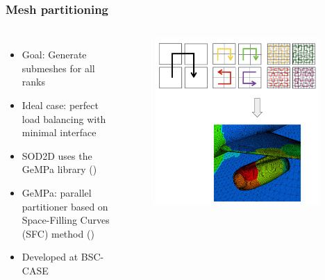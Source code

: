 \begin{frame}
	\frametitle{Mesh partitioning}
	\begin{columns}
		\begin{itemize}
			\item Goal: Generate submeshes for all ranks
			\item Ideal case: perfect load balancing with minimal interface
			\item SOD2D uses the GeMPa library (\cite{bib:gempa})
			\item GeMPa: parallel partitioner based on Space-Filling Curves (SFC) method (\cite{bib:ric})
			\item Developed at BSC-CASE
		\end{itemize}
		\begin{figure}
			\centering
			\includegraphics[width=0.95\textwidth]{images/gempa.png}
		\end{figure}
	\end{columns}
\end{frame}

